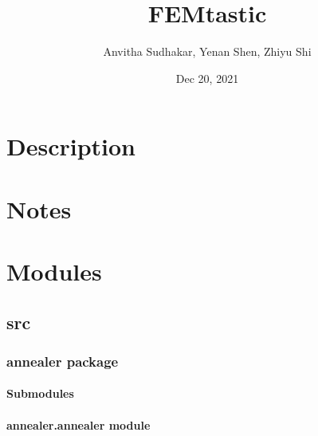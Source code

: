 \documentclass[letterpaper,10pt,english]{sphinxmanual}
\title{FEMtastic}
\date{Dec 20, 2021}
\author{Anvitha Sudhakar, Yenan Shen, Zhiyu Shi}
\begin{document}
\pagestyle{empty}
\sphinxmaketitle
\pagestyle{plain}
\sphinxtableofcontents
\pagestyle{normal}
\label{\detokenize{index::doc}}



\chapter{Description}
\label{\detokenize{index:description}}

\chapter{Notes}
\label{\detokenize{index:notes}}

\chapter{Modules}
\label{\detokenize{index:modules}}

\section{src}
\label{\detokenize{modules:src}}\label{\detokenize{modules::doc}}

\subsection{annealer package}
\label{\detokenize{annealer:annealer-package}}\label{\detokenize{annealer::doc}}

\subsubsection{Submodules}
\label{\detokenize{annealer:submodules}}

\subsubsection{annealer.annealer module}
\label{\detokenize{annealer:module-annealer.annealer}}\label{\detokenize{annealer:annealer-annealer-module}}
\end{document}
